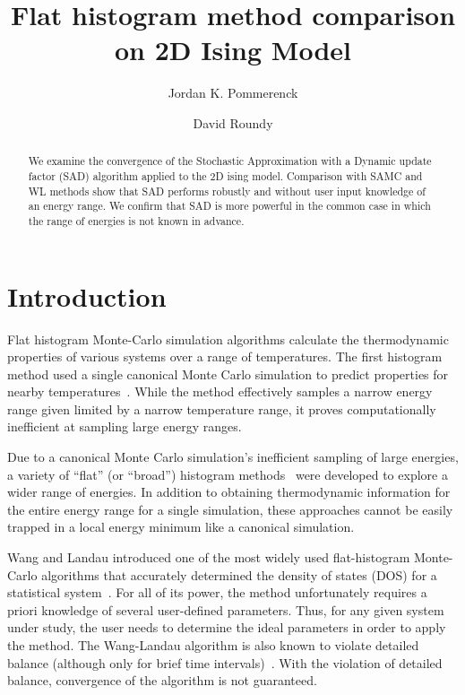 \documentclass[letterpaper,twocolumn,amsmath,amssymb,pre,aps,10pt]{revtex4-1}
\begin{document}
\title{Flat histogram method comparison on 2D Ising Model
}

\author{Jordan K. Pommerenck} \author{David Roundy}

\begin{abstract}
  We examine the convergence of the Stochastic Approximation with a Dynamic
  update factor (SAD) algorithm applied to the 2D ising model. Comparison with
  SAMC and WL methods show that SAD performs robustly and without user input
  knowledge of an energy range. We confirm that SAD is more powerful in the
  common case in which the range of energies is not known in advance. 
\end{abstract}

\maketitle

\section{Introduction}
Flat histogram Monte-Carlo simulation algorithms calculate the thermodynamic
properties of various systems over a range of temperatures.  The first histogram
method used a single canonical Monte Carlo simulation to predict properties for
nearby temperatures~\cite{ferrenberg1988new}. While the method effectively
samples a narrow energy range given limited by a narrow temperature range, it
proves computationally inefficient at sampling large energy ranges.

Due to a canonical Monte Carlo simulation's inefficient sampling of large
energies, a variety of ``flat'' (or ``broad'') histogram
methods~\cite{penna1996broad, penna1998broad, swendsen1999transition,
wang2001determining, wang2001efficient} were developed to explore a wider range
of energies.  In addition to obtaining thermodynamic information for the entire
energy range for a single simulation, these approaches cannot be easily trapped
in a local energy minimum like a canonical simulation.


Wang and Landau introduced one of the most widely used flat-histogram
Monte-Carlo algorithms that accurately determined the density of states (DOS) for
a statistical system~\cite{wang2001determining,wang2001efficient}. For all of
its power, the method unfortunately requires a priori knowledge of several
user-defined parameters. Thus, for any given system under study, the user needs
to determine the ideal parameters in order to apply the method. The Wang-Landau
algorithm is also known to violate detailed balance (although only for brief
time intervals)~\cite{yan2003fast, shell2002generalization}. With the violation
of detailed balance, convergence of the algorithm is not guaranteed.
\end{document}
